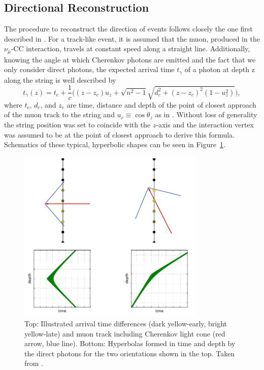 \subsection{Directional Reconstruction} \label{sec:directional_reconstruction}

The procedure to reconstruct the direction of events follows closely the one first described in \cite{2011APh....34..652A}.
For a track-like event, it is assumed that the muon, produced in the $\nu_\mu$-CC interaction, travels at constant speed along a straight line.
Additionally, knowing the angle at which Cherenkov photons are emitted and the fact that we only consider direct photons,
the expected arrival time $t_\gamma$ of a photon at depth z along the string is well described by
\begin{equation}
    t_\gamma(z) = t_c + \frac{1}{c} \Big( (z-z_c)u_z + \sqrt{n^2 - 1} \sqrt{d_c^2+(z-z_c)^2(1-u_z^2)} \Big),
    \label{eq:hyperbola_track}
\end{equation}
where $t_c$, $d_c$, and $z_c$ are time, distance and depth of the point of closest approach of the muon track to the string and $u_c\equiv \cos\theta _z$ as in \cite{2011APh....34..652A, JPGarza}.
Without loss of generality the string position was set to coincide with the $z$-axis and the interaction vertex was assumed to be at the point of closest approach to derive this formula.
Schematics of these typical, hyperbolic shapes can be seen in Figure~\ref{fig:hyperbolic_arrival_time}.

\begin{figure}[h]
	\begin{center}
        \includegraphics[width=0.8\textwidth]{figures/SANTA_direct_idea.pdf}
	\end{center}
    \caption[Hyperbolic time-depth pattern of muon passing a string, taken from \cite{JPGarza}]
    {Top: Illustrated arrival time differences (dark yellow-early, bright yellow-late) and muon track including Cherenkov light cone (red arrow, blue line).
    Bottom: Hyperbolas formed in time and depth by the direct photons for the two orientations shown in the top. Taken from \cite{JPGarza}.}
    \label{fig:hyperbolic_arrival_time}
\end{figure}

